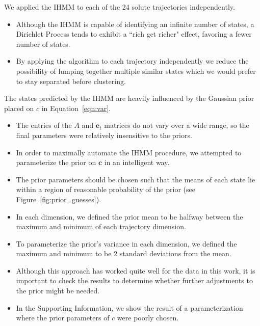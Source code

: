 \documentclass{article}
\begin{document}
  We applied the IHMM to each of the 24 solute trajectories independently.
  \begin{itemize}
    \item Although the IHMM is capable of identifying an infinite number of states, 
    a Dirichlet Process tends to exhibit a ``rich get richer" effect, favoring
    a fewer number of states.
    \item By applying the algorithm to each trajectory independently we reduce
    the possibility of lumping together multiple similar states which we
    would prefer to stay separated before clustering.
  \end{itemize}
  
  The states predicted by the IHMM are heavily influenced by the Gaussian prior
  placed on $c$ in Equation~\ref{eqn:var}.
  \begin{itemize}
    \item The entries of the $A$ and $\mathbf{e}_t$ matrices do not vary over a wide range, so
    the final parameters were relatively insensitive to the priors.
    \item In order to maximally automate the IHMM procedure, we attempted to
    parameterize the prior on $\mathbf{c}$ in an intelligent way.
    \item The prior parameters should be chosen such that the means of 
    each state lie within a region of reasonable probability of the prior (see
    Figure~\ref{fig:prior_guesses}).
    \item In each dimension, we defined the prior mean to be halfway between the 
    maximum and minimum of each trajectory dimension. 
    \item To parameterize the prior's variance in each dimension, we defined the maximum and minimum
    to be 2 standard deviations from the mean.
    \item Although this approach has worked quite well for the data in this work,
    it is important to check the results to determine whether further adjustments
    to the prior might be needed.
    \item In the Supporting Information, we show the result of a parameterization
    where the prior parameters of $c$ were poorly chosen. %
  \end{itemize}
  
\end{document}
